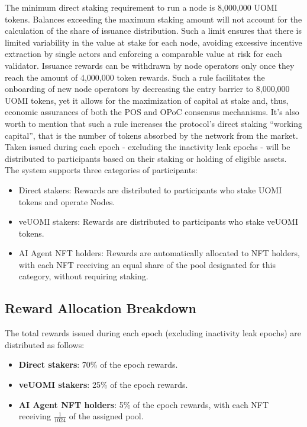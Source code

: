 \documentclass{article}
\begin{document}
The minimum direct staking requirement to run a node is 8,000,000 UOMI tokens. Balances exceeding the maximum staking amount will not account for the calculation of the share of issuance distribution. Such a limit ensures that there is limited variability in the value at stake for each node, avoiding excessive incentive extraction by single actors and enforcing a comparable value at risk for each validator.
Issuance rewards can be withdrawn by node operators only once they reach the amount of 4,000,000 token rewards. Such a rule facilitates the onboarding of new node operators by decreasing the entry barrier to 8,000,000 UOMI tokens, yet it allows for the maximization of capital at stake and, thus, economic assurances of both the POS and OPoC consensus mechanisms. It’s also worth to mention that such a rule increases the protocol’s direct staking “working capital”, that is the number of tokens absorbed by the network from the market.
Taken issued during each epoch - excluding the inactivity leak epochs - will be distributed to participants based on their staking or holding of eligible assets. The system supports three categories of participants:

\begin{itemize}
    \item Direct stakers: Rewards are distributed to participants who stake UOMI tokens and operate Nodes.
    \item veUOMI stakers: Rewards are distributed to participants who stake veUOMI tokens.
    \item AI Agent NFT holders: Rewards are automatically allocated to NFT holders, with each NFT receiving an equal share of the pool designated for this category, without requiring staking.
\end{itemize}
\subsection*{Reward Allocation Breakdown}

The total rewards issued during each epoch (excluding inactivity leak epochs) are distributed as follows:

\begin{itemize}
    \item \textbf{Direct stakers}: 70\% of the epoch rewards.
    \item \textbf{veUOMI stakers}: 25\% of the epoch rewards.
    \item \textbf{AI Agent NFT holders}: 5\% of the epoch rewards, with each NFT receiving $\frac{1}{1024}$ of the assigned pool.
\end{itemize}
\end{document}
